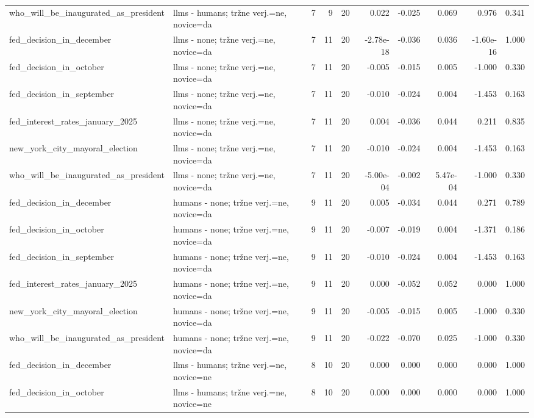 \begin{longtable}{llrrrrrrrr}
who\_will\_be\_inaugurated\_as\_president & llms - humans; tržne verj.=ne, novice=da & 7 & 9 & 20 & 0.022 & -0.025 & 0.069 & 0.976 & 0.341 \\
fed\_decision\_in\_december & llms - none; tržne verj.=ne, novice=da & 7 & 11 & 20 & -2.78e-18 & -0.036 & 0.036 & -1.60e-16 & 1.000 \\
fed\_decision\_in\_october & llms - none; tržne verj.=ne, novice=da & 7 & 11 & 20 & -0.005 & -0.015 & 0.005 & -1.000 & 0.330 \\
fed\_decision\_in\_september & llms - none; tržne verj.=ne, novice=da & 7 & 11 & 20 & -0.010 & -0.024 & 0.004 & -1.453 & 0.163 \\
fed\_interest\_rates\_january\_2025 & llms - none; tržne verj.=ne, novice=da & 7 & 11 & 20 & 0.004 & -0.036 & 0.044 & 0.211 & 0.835 \\
new\_york\_city\_mayoral\_election & llms - none; tržne verj.=ne, novice=da & 7 & 11 & 20 & -0.010 & -0.024 & 0.004 & -1.453 & 0.163 \\
who\_will\_be\_inaugurated\_as\_president & llms - none; tržne verj.=ne, novice=da & 7 & 11 & 20 & -5.00e-04 & -0.002 & 5.47e-04 & -1.000 & 0.330 \\
fed\_decision\_in\_december & humans - none; tržne verj.=ne, novice=da & 9 & 11 & 20 & 0.005 & -0.034 & 0.044 & 0.271 & 0.789 \\
fed\_decision\_in\_october & humans - none; tržne verj.=ne, novice=da & 9 & 11 & 20 & -0.007 & -0.019 & 0.004 & -1.371 & 0.186 \\
fed\_decision\_in\_september & humans - none; tržne verj.=ne, novice=da & 9 & 11 & 20 & -0.010 & -0.024 & 0.004 & -1.453 & 0.163 \\
fed\_interest\_rates\_january\_2025 & humans - none; tržne verj.=ne, novice=da & 9 & 11 & 20 & 0.000 & -0.052 & 0.052 & 0.000 & 1.000 \\
new\_york\_city\_mayoral\_election & humans - none; tržne verj.=ne, novice=da & 9 & 11 & 20 & -0.005 & -0.015 & 0.005 & -1.000 & 0.330 \\
who\_will\_be\_inaugurated\_as\_president & humans - none; tržne verj.=ne, novice=da & 9 & 11 & 20 & -0.022 & -0.070 & 0.025 & -1.000 & 0.330 \\
fed\_decision\_in\_december & llms - humans; tržne verj.=ne, novice=ne & 8 & 10 & 20 & 0.000 & 0.000 & 0.000 & 0.000 & 1.000 \\
fed\_decision\_in\_october & llms - humans; tržne verj.=ne, novice=ne & 8 & 10 & 20 & 0.000 & 0.000 & 0.000 & 0.000 & 1.000 \\

\end{longtable}
